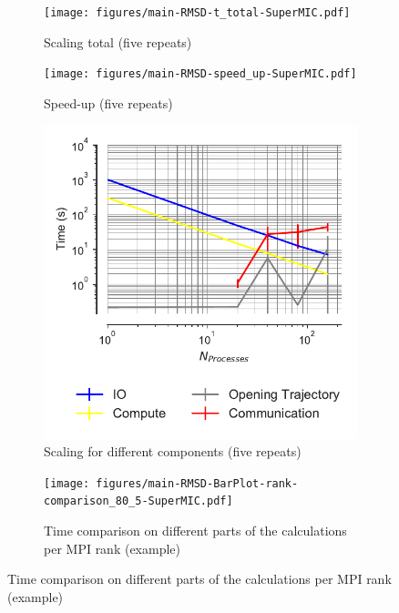 \begin{figure}[ht!]
\centering
\begin{subfigure}{.4\textwidth}
  \texttt{[image: figures/main-RMSD-t\_total-SuperMIC.pdf]}
  \caption{Scaling total (five repeats)}
  \label{fig:MPIscaling-SuperMIC}
\end{subfigure}
\hfill
\begin{subfigure}{.4\textwidth}
  \texttt{[image: figures/main-RMSD-speed\_up-SuperMIC.pdf]}
  \caption{Speed-up (five repeats)}
  \label{fig:MPIspeedup-SuperMIC}
\end{subfigure}
\bigskip

\begin{subfigure}{.4\textwidth}
  \includegraphics[width=\linewidth]{figures/main-RMSD-time_comp_IO_comparison-SuperMIC.pdf}
  \captionsetup{format=hang}
\caption{Scaling for different components (five repeats)}
\label{fig:ScalingComputeIO-SuperMIC}
\end{subfigure}
\hfill
\begin{subfigure} {.5\textwidth}
  \texttt{[image: figures/main-RMSD-BarPlot-rank-comparison\_80\_5-SuperMIC.pdf]}
  \captionsetup{format=hang}
  \caption{Time comparison on different parts of the calculations per MPI rank (example)}
  \label{fig:MPIranks-SuperMIC}
\end{subfigure}


\end{figure}
